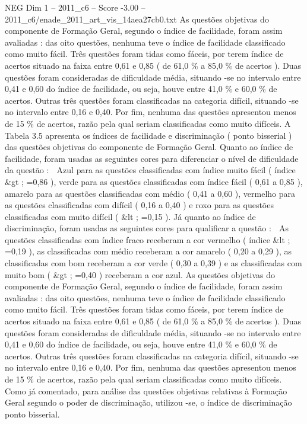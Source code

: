 \begin{textsample}{NEG Dim 1 – 2011\_c6 – Score -3.00 – 2011\_c6/enade\_2011\_art\_vis\_14aea27cb0.txt}
As questões objetivas do componente de Formação Geral, segundo o índice de facilidade, foram assim avaliadas : das oito questões, nenhuma teve o índice de facilidade classificado como muito fácil.
Três questões foram tidas como fáceis, por terem índice de acertos situado na faixa entre 0,61 e 0,85 ( de 61,0 \% a 85,0 \% de acertos ).
Duas questões foram consideradas de dificuldade média, situando -se no intervalo entre 0,41 e 0,60 do índice de facilidade, ou seja, houve entre 41,0 \% e 60,0 \% de acertos.
Outras três questões foram classificadas na categoria difícil, situando -se no intervalo entre 0,16 e 0,40.
Por fim, nenhuma das questões apresentou menos de 15 \% de acertos, razão pela qual seriam classificadas como muito difíceis.
A Tabela 3.5 apresenta os índices de facilidade e discriminação ( ponto bisserial ) das questões objetivas do componente de Formação Geral.
Quanto ao índice de facilidade, foram usadas as seguintes cores para diferenciar o nível de dificuldade da questão :  Azul para as questões classificadas com índice muito fácil ( índice \&gt ; =0,86 ), verde para as questões classificadas com índice fácil ( 0,61 a 0,85 ), amarelo para as questões classificadas com médio ( 0,41 a 0,60 ), vermelho para as questões classificadas com difícil ( 0,16 a 0,40 ) e roxo para as questões classificadas com muito difícil ( \&lt ; =0,15 ).
Já quanto ao índice de discriminação, foram usadas as seguintes cores para qualificar a questão :  As questões classificadas com índice fraco receberam a cor vermelho ( índice \&lt ; =0,19 ), as classificadas com médio receberam a cor amarelo ( 0,20 a 0,29 ), as classificadas com bom receberam a cor verde ( 0,30 a 0,39 ) e as classificadas com muito bom ( \&gt ; =0,40 ) receberam a cor azul.
As questões objetivas do componente de Formação Geral, segundo o índice de facilidade, foram assim avaliadas : das oito questões, nenhuma teve o índice de facilidade classificado como muito fácil.
Três questões foram tidas como fáceis, por terem índice de acertos situado na faixa entre 0,61 e 0,85 ( de 61,0 \% a 85,0 \% de acertos ).
Duas questões foram consideradas de dificuldade média, situando -se no intervalo entre 0,41 e 0,60 do índice de facilidade, ou seja, houve entre 41,0 \% e 60,0 \% de acertos.
Outras três questões foram classificadas na categoria difícil, situando -se no intervalo entre 0,16 e 0,40.
Por fim, nenhuma das questões apresentou menos de 15 \% de acertos, razão pela qual seriam classificadas como muito difíceis.
Como já comentado, para análise das questões objetivas relativas à Formação Geral segundo o poder de discriminação, utilizou -se, o índice de discriminação ponto bisserial.

\end{textsample}
